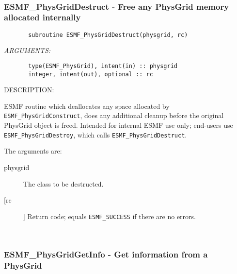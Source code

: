 \begin{verbatim} \end{verbatim}
 
 
\mbox{}\hrulefill\ 
 
\subsubsection{ESMF\_PhysGridDestruct - Free any PhysGrid memory allocated internally}


\begin{verbatim}       subroutine ESMF_PhysGridDestruct(physgrid, rc)\end{verbatim}{\em ARGUMENTS:}
\begin{verbatim}       type(ESMF_PhysGrid), intent(in) :: physgrid    
       integer, intent(out), optional :: rc         \end{verbatim}
{\sf DESCRIPTION:\\ }


       ESMF routine which deallocates any space allocated by
      {\tt  ESMF\_PhysGridConstruct}, does any additional cleanup before the
       original PhysGrid object is freed.  Intended for internal ESMF
       use only; end-users use {\tt ESMF\_PhysGridDestroy}, which calls
       {\tt ESMF\_PhysGridDestruct}.  
  
       The arguments are:
       \begin{description}
       \item[physgrid] 
            The class to be destructed.
       \item[[rc]] 
            Return code; equals {\tt ESMF\_SUCCESS} if there are no errors.
       \end{description}
   
 
\mbox{}\hrulefill\ 
 
\subsubsection{ESMF\_PhysGridGetInfo - Get information from a PhysGrid}


